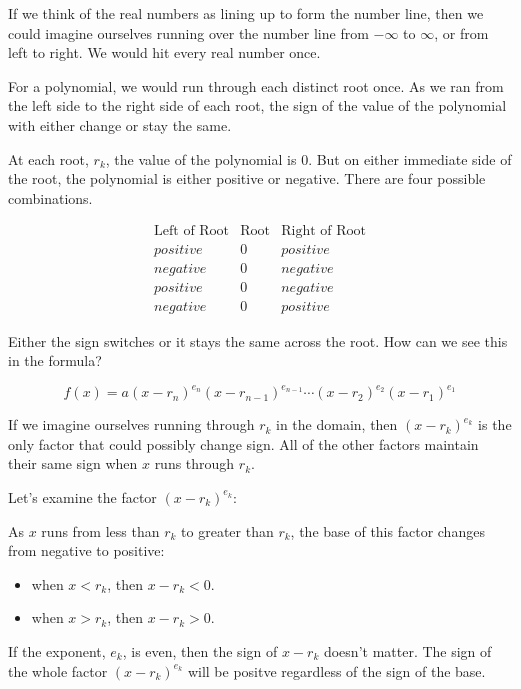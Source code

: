 \documentclass{ximera}
\begin{document}
If we think of the real numbers as lining up to form the number line, then we could imagine ourselves running over the number line from $-\infty$ to $\infty$, or from left to right.  We would hit every real number once.  

For a polynomial, we would run through each distinct root once.  As we ran from the left side to the right side of each root, the sign of the value of the polynomial with either change or stay the same.

At each root, $r_k$, the value of the polynomial is $0$.  But on either immediate side of the root, the polynomial is either positive or negative. There are four possible combinations.


\[
\begin{array}{rcl}
\text{Left of Root}  & \text{Root}  & \text{Right of Root} \\
positive & 0 & positive \\
negative & 0 & negative \\
positive & 0 & negative \\
negative & 0 & positive
\end{array}
\]


Either the sign switches or it stays the same across the root.  How can we see this in the formula?



\[   f(x) = a (x-r_n)^{e_n} (x-r_{n-1})^{e_{n-1}}  \cdots (x-r_2)^{e_2} (x-r_1)^{e_1}  \]


If we imagine ourselves running through $r_k$ in the domain, then $(x-r_k)^{e_k}$ is the only factor that could possibly change sign.  All of the other factors maintain their same sign when $x$ runs through $r_k$.



Let's examine the factor $(x-r_k)^{e_k}$:

As $x$ runs from less than $r_k$ to greater than $r_k$, the base of this factor changes from negative to positive:

\begin{itemize}
\item when $x<r_k$, then $x-r_k <0$.  \\

\item when $x>r_k$, then $x-r_k >0$. \\
\end{itemize}


If the exponent, $e_k$, is even, then the sign of $x-r_k$ doesn't matter. The sign of the whole factor $(x-r_k)^{e_k}$ will be positve regardless of the sign of the base.
\end{document}
